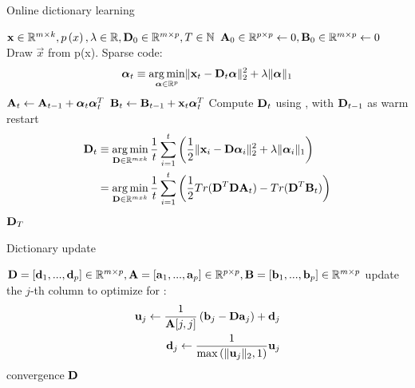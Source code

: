 \begin{algorithm}[h]
\caption{Online dictionary learning}
\label{alg:trainDL}
\begin{algorithmic}[1]
\REQUIRE $\boldsymbol{\mathrm{x}} \in \mathbb{R}^{m \times k},  p \left( x \right), \lambda \in
\mathbb{R}, \boldsymbol{\mathrm{D}}_0 \in \mathbb{R}^{m \times p}, T \in \mathbb{N}$
\STATE $\boldsymbol{\mathrm{A}}_0 \in \mathbb{R}^{p \times p} \gets  0, \boldsymbol{\mathrm{B}}_0 \in
\mathbb{R}^{m \times p}\gets 0$
\STATE Draw $\vec{x}$ from p(x).
\STATE Sparse code:
\begin{align*} 
\boldsymbol{\mathrm{\alpha}}_t \equiv \operatorname*{arg\,min}_{\boldsymbol{\mathrm{\alpha}}\in\mathbb{R}^{p}}  \lVert \boldsymbol{\mathrm{x}}_t
- \boldsymbol{\mathrm{D}}_t\boldsymbol{\mathrm{\alpha}} \rVert^{2}_{2}  +  \lambda \lVert \boldsymbol{\mathrm{\alpha}}
\rVert_{1}
\end{align*}
\STATE $\boldsymbol{\mathrm{A}}_t \gets \boldsymbol{\mathrm{A}}_{t-1} +
\boldsymbol{\mathrm{\alpha}}_t\boldsymbol{\mathrm{\alpha}}_t^T$\label{alg:Aupdate}
\STATE $\boldsymbol{\mathrm{B}}_t \gets \boldsymbol{\mathrm{B}}_{t-1} +
\boldsymbol{\mathrm{x}}_t\boldsymbol{\mathrm{\alpha}}_t^T$\label{alg:Bupdate}
\STATE Compute $\boldsymbol{\mathrm{D}}_t$ using , with $\boldsymbol{\mathrm{D}}_{t-1}$ as
warm restart 
\begin{equation}
\begin{split}
\boldsymbol{\mathrm{D}}_t  & \equiv \operatorname*{arg\,min}_{\boldsymbol{\mathrm{D}} \in \mathbb{R}^{m x k}}  \frac{1}{t}
\sum_{i=1}^t
\left( \frac{1}{2} \lVert \boldsymbol{\mathrm{x}}_i - \boldsymbol{\mathrm{D}}\boldsymbol{\mathrm{\alpha}}_i \rVert^{2}_{2}  + 
\lambda \lVert
\boldsymbol{\mathrm{\alpha}}_i \rVert_{1} \right) \\
& = \operatorname*{arg\,min}_{\boldsymbol{\mathrm{D}} \in \mathbb{R}^{m x k}}  \frac{1}{t} \sum_{i=1}^t
\left( \frac{1}{2} Tr(\boldsymbol{\mathrm{D}}^T\boldsymbol{\mathrm{D}}\boldsymbol{\mathrm{A}}_t) - Tr(\boldsymbol{\mathrm{D}}^T\boldsymbol{\mathrm{B}}_t)\right)
\label{eq:update}
\end{split}
\end{equation} 
\ENDFOR
\RETURN $\boldsymbol{\mathrm{D}}_T$
\end{algorithmic}
\end{algorithm}
\begin{algorithm}[h]
\caption{Dictionary update}
\label{alg:update}
\begin{algorithmic}[1]
\REQUIRE $\boldsymbol{\mathrm{D}}=[\boldsymbol{\mathrm{d}}_1,...,\boldsymbol{\mathrm{d}}_p] \in \mathbb{R}^{m \times p},
\boldsymbol{\mathrm{A}}=[\boldsymbol{\mathrm{a}}_1,...,\boldsymbol{\mathrm{a}}_p] \in \mathbb{R}^{p \times p},
\boldsymbol{\mathrm{B}}=[\boldsymbol{\mathrm{b}}_1,...,\boldsymbol{\mathrm{b}}_p] \in \mathbb{R}^{m \times p}$
\REPEAT
{}
\STATE update the $j$-th column to optimize for :
\begin{align*}
\boldsymbol{\mathrm{u}}_j \gets
\frac{1}{\boldsymbol{\mathrm{A}}[j,j]}\left(\boldsymbol{\mathrm{b}}_j-\boldsymbol{\mathrm{D}}\boldsymbol{\mathrm{a}}_j\right)+\boldsymbol{\mathrm{d}}_j \\
\boldsymbol{\mathrm{d}}_j \gets \frac{1}{\max\left(\lVert \boldsymbol{\mathrm{u}}_j \rVert_2,1\right)} \boldsymbol{\mathrm{u}}_j
\end{align*}
\ENDFOR
\UNTIL convergence 
\RETURN $\boldsymbol{\mathrm{D}}$
\end{algorithmic}
\end{algorithm}
